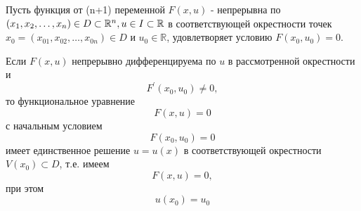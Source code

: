 \begin{theorem}
    Пусть функция от (n+1) переменной $F(x,u)$ - непрерывна по $(x_1, x_2, \ldots, x_n) \in D \subset \mathbb{R}^n, u \in I \subset \mathbb{R}$ в соответствующей окрестности точек $x_0 = (x_{01}, x_{02}, \ldots, x_{0n}) \in D$ и $u_0 \in \mathbb{R}$, удовлетворяет условию $F(x_0, u_0) = 0$.
    
    Если $F(x, u)$ непрерывно дифференцируема по $u$ в рассмотренной окрестности и
    \begin{equation}
    \label{234}
    F^{'}(x_0,u_0) \ne 0,
    \end{equation}
    то функциональное уравнение
    \begin{equation}
    \label{231}
    F(x,u) = 0
    \end{equation}
    с начальным условием
    \begin{equation}
    \label{232}
    F(x_0, u_0) = 0
    \end{equation}
    имеет единственное решение $u = u(x)$ в соответствующей окрестности $V(x_0) \subset D$, т.е. имеем
    \begin{equation}
    \label{233}
    F(x, u) = 0,
    \end{equation}
    при этом
    \begin{equation}
    \label{235}
    u(x_0) = u_0
    \end{equation} 
\end{theorem}
